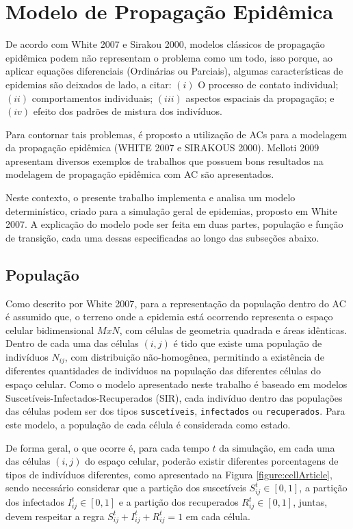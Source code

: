 \documentclass[a4paper,12pt]{article}
\begin{document}
\section{Modelo de Propagação Epidêmica}
De acordo com White 2007\cite{White2007} e Sirakou 2000\cite{Sirakoulis2000}, modelos clássicos de propagação epidêmica podem não representam o problema como um todo, isso porque, ao aplicar equações diferenciais (Ordinárias ou Parciais), algumas características de epidemias são deixados de lado, a citar: $(i)$ O processo de contato individual; $(ii)$ comportamentos individuais; $(iii)$ aspectos espaciais da propagação; e $(iv)$ efeito dos padrões de mistura dos indivíduos.

Para contornar tais problemas, é proposto a utilização de ACs para a modelagem da propagação epidêmica (WHITE 2007\cite{White2007} e SIRAKOUS 2000\cite{Sirakoulis2000}). Melloti 2009\cite{Melotti2009} apresentam diversos exemplos de trabalhos que possuem bons resultados na modelagem de propagação epidêmica com AC são apresentados.

Neste contexto, o presente trabalho implementa e analisa um modelo determinístico, criado para a simulação geral de epidemias, proposto em White 2007\cite{White2007}. A explicação do modelo pode ser feita em duas partes, população e função de transição, cada uma dessas especificadas ao longo das subseções abaixo. \\

\subsection{População}
Como descrito por White 2007\cite{White2007}, para a representação da população dentro do AC é assumido que, o terreno onde a epidemia está ocorrendo representa o espaço celular bidimensional $MxN$, com células de geometria quadrada e áreas idênticas. Dentro de cada uma das células $(i,j)$ é tido que existe uma população de indivíduos $N_{ij}$, com distribuição não-homogênea, permitindo a existência de diferentes quantidades de indivíduos na população das diferentes células do espaço celular. Como o modelo apresentado neste trabalho é baseado em modelos Suscetíveis-Infectados-Recuperados (SIR), cada indivíduo dentro das populações das células podem ser dos tipos \texttt{suscetíveis}, \texttt{infectados} ou \texttt{recuperados}. Para este modelo, a população de cada célula é considerada como estado.

De forma geral, o que ocorre é, para cada tempo $t$ da simulação, em cada uma das células $(i,j)$ do espaço celular, poderão existir diferentes porcentagens de tipos de indivíduos diferentes, como apresentado na Figura \ref{figure:cellArticle}, sendo necessário considerar que a partição dos suscetíveis $S_{ij}^t \in [0, 1]$, a partição dos infectados $I_{ij}^t \in [0, 1]$ e a partição dos recuperados $R_{ij}^t \in [0, 1]$, juntas, devem respeitar a regra $S_{ij}^t + I_{ij}^t + R_{ij}^t = 1$ em cada célula.
\end{document}
